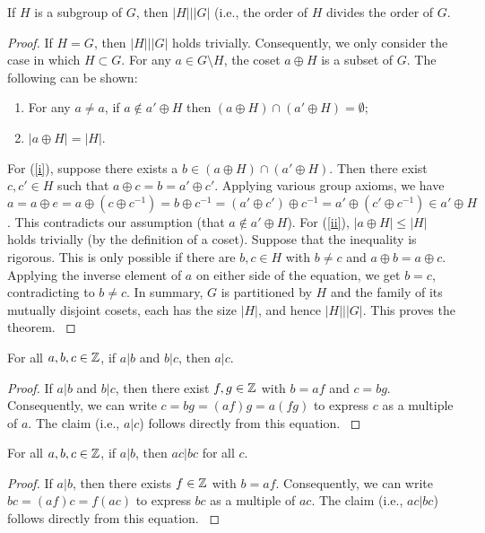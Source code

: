 \begin{theo}
If $H$ is a subgroup of $G$, then $\left|H\right||\left|G\right|$ (i.e., the order of $H$ divides the order of $G$.
\begin{proof}
If $H=G$, then $\left|H\right||\left|G\right|$ holds trivially. Consequently, we only consider the case in which $H\subset G$. For any $a\in G\setminus H$, the coset $a\oplus H$ is a subset of $G$. The following can be shown:
\begin{enumerate}
 \item \label{i} For any $a \neq a$, if $a\notin a'\oplus H$ then $\left(a\oplus H\right)\cap\left(a'\oplus H\right)=\emptyset$;
 \item \label{ii} $\left|a\oplus H\right|=\left|H\right|$.
\end{enumerate}
For (\ref{i}{}), suppose there exists a $b\in\left(a\oplus H\right)\cap\left(a'\oplus H\right)$. Then there exist $c,c'\in H$ such that $a\oplus c=b=a'\oplus c'$. Applying various group axioms, we have $a=a\oplus e= a\oplus\left(c\oplus c^{-1}\right)=b\oplus c^{-1}=\left(a'\oplus c'\right)\oplus c^{-1}=a'\oplus\left(c'\oplus c^{-1}\right)\in a'\oplus H$. This contradicts our assumption (that $a\notin a'\oplus H$).
For (\ref{ii}{}), $\left|a\oplus H\right|\leq\left|H\right|$ holds trivially (by the definition of a coset). Suppose that the inequality is rigorous. This is only possible if there are $b,c\in H$ with $b\neq c$ and $a\oplus b = a\oplus c$. Applying the inverse element of $a$ on either side of the equation, we get $b=c$, contradicting to $b\neq c$.
In summary, $G$ is partitioned by $H$ and the family of its mutually disjoint cosets, each has the size $\left|H\right|$, and hence $\left|H\right||\left|G\right|$. This proves the theorem.
\cite{Oppliger:2011:CC:2049860}
\end{proof}
\end{theo}

\begin{theo}
For all $a,b,c\in\mathbb{Z}$, if $a|b$ and $b|c$, then $a|c$.
\begin{proof}
If $a|b$ and $b|c$, then there exist $f,g\in\mathbb{Z}$ with $b=af$ and $c=bg$. Consequently, we can write $c=bg= \left(af\right)g = a\left(fg\right)$ to express $c$ as a multiple of $a$. The claim (i.e., $a|c$) follows directly from this equation.
\cite{Oppliger:2011:CC:2049860}
\end{proof}
\end{theo}

\begin{theo}
For all $a,b,c\in\mathbb{Z}$, if $a|b$, then $ac|bc$ for all $c$.
\begin{proof}
If $a|b$, then there exists $f\in\mathbb{Z}$ with $b=af$. Consequently, we can write $bc=\left(af\right)c=f\left(ac\right)$ to express $bc$ as a multiple of $ac$. The claim (i.e., $ac|bc$) follows directly from this equation.
\cite{Oppliger:2011:CC:2049860}
\end{proof}
\end{theo}

